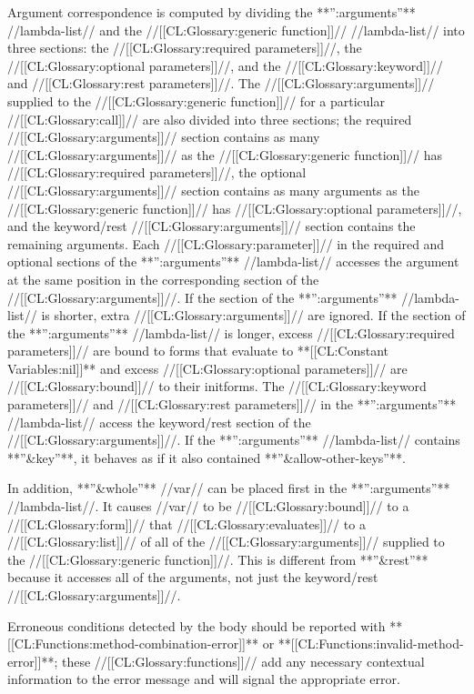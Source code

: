 Argument correspondence is computed by dividing the **'':arguments''** //lambda-list// and the //[[CL:Glossary:generic function]]// //lambda-list// into three sections: the //[[CL:Glossary:required parameters]]//, the //[[CL:Glossary:optional parameters]]//, and the //[[CL:Glossary:keyword]]// and //[[CL:Glossary:rest parameters]]//. The //[[CL:Glossary:arguments]]// supplied to the //[[CL:Glossary:generic function]]// for a particular //[[CL:Glossary:call]]// are also divided into three sections; the required //[[CL:Glossary:arguments]]// section contains as many //[[CL:Glossary:arguments]]// as the //[[CL:Glossary:generic function]]// has //[[CL:Glossary:required parameters]]//, the optional //[[CL:Glossary:arguments]]// section contains as many arguments as the //[[CL:Glossary:generic function]]// has //[[CL:Glossary:optional parameters]]//, and the keyword/rest //[[CL:Glossary:arguments]]// section contains the remaining arguments. Each //[[CL:Glossary:parameter]]// in the required and optional sections of the **'':arguments''** //lambda-list// accesses the argument at the same position in the corresponding section of the //[[CL:Glossary:arguments]]//. If the section of the **'':arguments''** //lambda-list// is shorter, extra //[[CL:Glossary:arguments]]// are ignored. If the section of the **'':arguments''** //lambda-list// is longer, excess //[[CL:Glossary:required parameters]]// are bound to forms that evaluate to **[[CL:Constant Variables:nil]]** and excess //[[CL:Glossary:optional parameters]]// are //[[CL:Glossary:bound]]// to their initforms. The //[[CL:Glossary:keyword parameters]]// and //[[CL:Glossary:rest parameters]]// in the **'':arguments''** //lambda-list// access the keyword/rest section of the //[[CL:Glossary:arguments]]//. If the **'':arguments''** //lambda-list// contains **''&key''**, it behaves as if it also contained **''&allow-other-keys''**.

In addition, **''&whole''** //var// can be placed first in the **'':arguments''** //lambda-list//. It causes //var// to be //[[CL:Glossary:bound]]// to a //[[CL:Glossary:form]]// that //[[CL:Glossary:evaluates]]// to a //[[CL:Glossary:list]]// of all of the //[[CL:Glossary:arguments]]// supplied to the //[[CL:Glossary:generic function]]//. This is different from **''&rest''** because it accesses all of the arguments, not just the keyword/rest //[[CL:Glossary:arguments]]//.

Erroneous conditions detected by the body should be reported with **[[CL:Functions:method-combination-error]]** or **[[CL:Functions:invalid-method-error]]**; these //[[CL:Glossary:functions]]// add any necessary contextual information to the error message and will signal the appropriate error.

